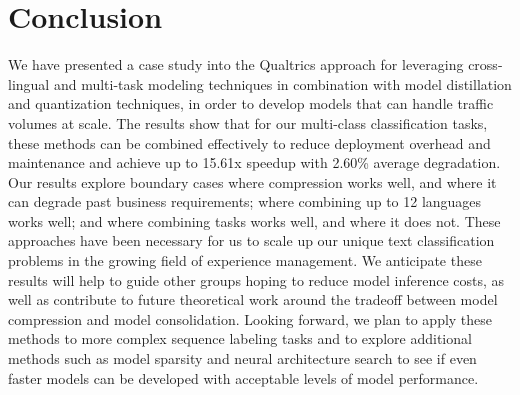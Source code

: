 \section{Conclusion}
We have presented a case study into the Qualtrics approach for leveraging cross-lingual and multi-task modeling techniques in combination with model distillation and quantization techniques, in order to develop models that can handle traffic volumes at scale.
The results show that for our multi-class classification tasks, these methods can be combined effectively to reduce deployment overhead and maintenance and achieve up to 15.61x speedup with 2.60\% average degradation.
Our results explore boundary cases where compression works well, and where it can degrade past business requirements; where combining up to 12 languages works well; and where combining tasks works well, and where it does not.
These approaches have been necessary for us to scale up our unique text classification problems in the growing field of experience management.
We anticipate these results will help to guide other groups hoping to reduce model inference costs, as well as contribute to future theoretical work around the tradeoff between model compression and model consolidation.
Looking forward, we plan to apply these methods to more complex sequence labeling tasks and to explore additional methods such as model sparsity and neural architecture search to see if even faster models can be developed with acceptable levels of model performance.

